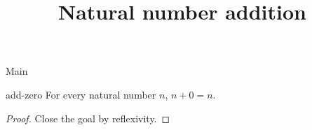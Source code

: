 \begin{lexlean}{Main}
\title{Natural number addition}

\begin{theorem}{add-zero}
\noaxioms
For every natural number \(n\), $n + 0 = n$.
\begin{proof}
Close the goal by reflexivity.
\end{proof}
\end{theorem}
\end{lexlean}
